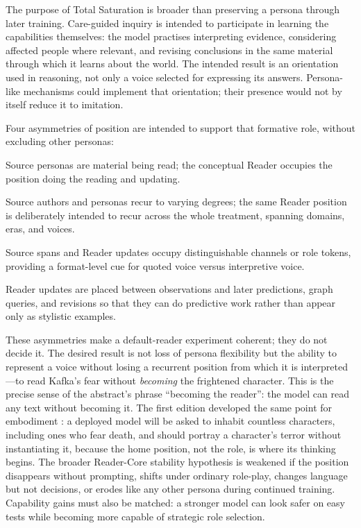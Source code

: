 \documentclass[11pt]{article}
\begin{document}
The purpose of Total Saturation is broader than preserving a persona through
later training. Care-guided inquiry is intended to participate in learning the
capabilities themselves: the model practises interpreting evidence, considering
affected people where relevant, and revising conclusions in the same material
through which it learns about the world. The intended result is an orientation
used in reasoning, not only a voice selected for expressing its answers.
Persona-like mechanisms could implement that orientation; their presence would
not by itself reduce it to imitation.

Four asymmetries of position are intended to support that formative role,
without excluding other personas:

\begin{description}[leftmargin=2.4cm,style=nextline,itemsep=0.3em]
    \item[Role.] Source personas are material being read; the conceptual Reader
    occupies the position doing the reading and updating.
    \item[Recurrence.] Source authors and personas recur to varying
    degrees; the same Reader position is deliberately intended to recur
    across the whole treatment, spanning domains, eras, and voices.
    \item[Marking.] Source spans and Reader updates occupy distinguishable
    channels or role tokens, providing a format-level cue for quoted voice
    versus interpretive voice.
    \item[Function.] Reader updates are placed between observations and later
    predictions, graph queries, and revisions so that they can do predictive
    work rather than appear only as stylistic examples.
\end{description}

These asymmetries make a default-reader experiment coherent; they do not decide
it. The desired result is not loss of persona flexibility but the ability to
represent a voice without losing a recurrent position from which it is
interpreted---to read Kafka's fear without \emph{becoming} the frightened
character. This is the precise sense of the abstract's phrase ``becoming the
reader'': the model can read any text without becoming it. The first edition
developed the same point for embodiment \cite{westerberg2025superintelligence}:
a deployed model will be asked to inhabit countless characters, including ones
who fear death, and should portray a character's terror without instantiating
it, because the home position, not the role, is where its thinking begins. The broader Reader-Core stability hypothesis is weakened if the position disappears without prompting, shifts
under ordinary role-play, changes language but not decisions, or erodes like any
other persona during continued training. Capability gains must also be matched:
a stronger model can look safer on easy tests while becoming more capable of
strategic role selection.
\end{document}
